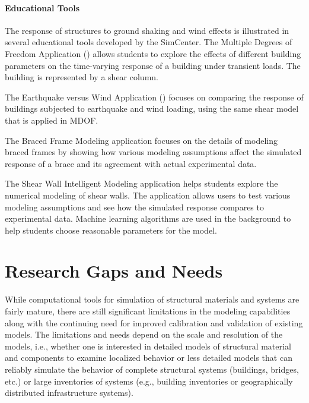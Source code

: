 \paragraph{Educational Tools} 
The response of structures to ground shaking and wind effects is illustrated in several educational tools developed by the SimCenter. The Multiple Degrees of Freedom Application () allows students to explore the effects of different building parameters on the time-varying response of a building under transient loads. The building is represented by a shear column. 

\noindent The Earthquake versus Wind Application () focuses on comparing the response of buildings subjected to earthquake and wind loading, using the same shear model that is applied in MDOF.

\noindent The Braced Frame Modeling  application focuses on the details of modeling braced frames by showing how various modeling assumptions affect the simulated response of a brace and its agreement with actual experimental data.

\noindent The Shear Wall Intelligent Modeling  application helps students explore the numerical modeling of shear walls. The application allows users to test various modeling assumptions and see how the simulated response compares to experimental data. Machine learning algorithms are used in the background to help students choose reasonable parameters for the model.

\section{Research Gaps and Needs}
\label{sec:resp_struct_gaps}

While computational tools for simulation of structural materials and systems are fairly mature, there are still significant limitations in the modeling capabilities along with the continuing need for improved calibration and validation of existing models. The limitations and needs depend on the scale and resolution of the models, i.e., whether one is interested in detailed models of structural material and components to examine localized behavior or less detailed models that can reliably simulate the behavior of complete structural systems (buildings, bridges, etc.) or large inventories of systems (e.g., building inventories or geographically distributed infrastructure systems).

